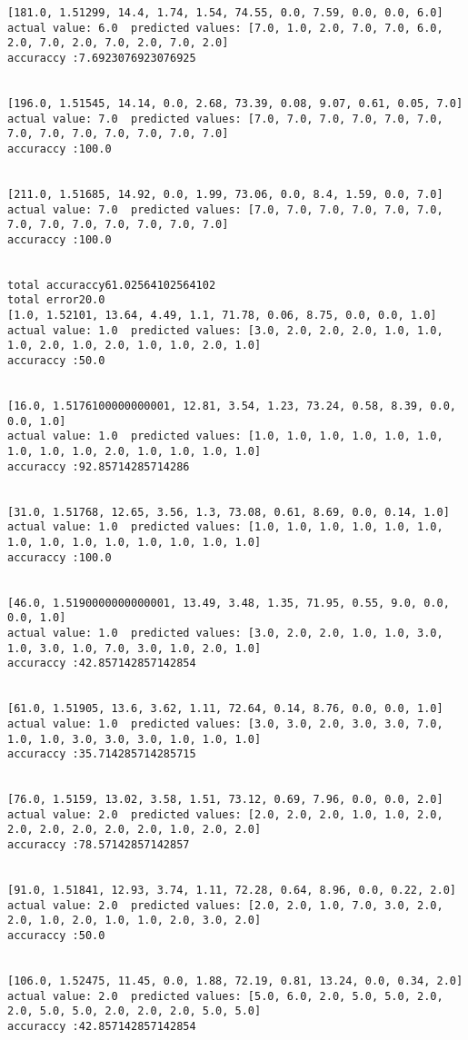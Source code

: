 \documentclass[11pt]{article}
\begin{document}
\begin{Verbatim}[commandchars=\\\{\}]
[181.0, 1.51299, 14.4, 1.74, 1.54, 74.55, 0.0, 7.59, 0.0, 0.0, 6.0]
actual value: 6.0  predicted values: [7.0, 1.0, 2.0, 7.0, 7.0, 6.0, 2.0, 7.0, 2.0, 7.0, 2.0, 7.0, 2.0]
accuraccy :7.6923076923076925


[196.0, 1.51545, 14.14, 0.0, 2.68, 73.39, 0.08, 9.07, 0.61, 0.05, 7.0]
actual value: 7.0  predicted values: [7.0, 7.0, 7.0, 7.0, 7.0, 7.0, 7.0, 7.0, 7.0, 7.0, 7.0, 7.0, 7.0]
accuraccy :100.0


[211.0, 1.51685, 14.92, 0.0, 1.99, 73.06, 0.0, 8.4, 1.59, 0.0, 7.0]
actual value: 7.0  predicted values: [7.0, 7.0, 7.0, 7.0, 7.0, 7.0, 7.0, 7.0, 7.0, 7.0, 7.0, 7.0, 7.0]
accuraccy :100.0


total accuraccy61.02564102564102
total error20.0
[1.0, 1.52101, 13.64, 4.49, 1.1, 71.78, 0.06, 8.75, 0.0, 0.0, 1.0]
actual value: 1.0  predicted values: [3.0, 2.0, 2.0, 2.0, 1.0, 1.0, 1.0, 2.0, 1.0, 2.0, 1.0, 1.0, 2.0, 1.0]
accuraccy :50.0


[16.0, 1.5176100000000001, 12.81, 3.54, 1.23, 73.24, 0.58, 8.39, 0.0, 0.0, 1.0]
actual value: 1.0  predicted values: [1.0, 1.0, 1.0, 1.0, 1.0, 1.0, 1.0, 1.0, 1.0, 2.0, 1.0, 1.0, 1.0, 1.0]
accuraccy :92.85714285714286


[31.0, 1.51768, 12.65, 3.56, 1.3, 73.08, 0.61, 8.69, 0.0, 0.14, 1.0]
actual value: 1.0  predicted values: [1.0, 1.0, 1.0, 1.0, 1.0, 1.0, 1.0, 1.0, 1.0, 1.0, 1.0, 1.0, 1.0, 1.0]
accuraccy :100.0


[46.0, 1.5190000000000001, 13.49, 3.48, 1.35, 71.95, 0.55, 9.0, 0.0, 0.0, 1.0]
actual value: 1.0  predicted values: [3.0, 2.0, 2.0, 1.0, 1.0, 3.0, 1.0, 3.0, 1.0, 7.0, 3.0, 1.0, 2.0, 1.0]
accuraccy :42.857142857142854


[61.0, 1.51905, 13.6, 3.62, 1.11, 72.64, 0.14, 8.76, 0.0, 0.0, 1.0]
actual value: 1.0  predicted values: [3.0, 3.0, 2.0, 3.0, 3.0, 7.0, 1.0, 1.0, 3.0, 3.0, 3.0, 1.0, 1.0, 1.0]
accuraccy :35.714285714285715


[76.0, 1.5159, 13.02, 3.58, 1.51, 73.12, 0.69, 7.96, 0.0, 0.0, 2.0]
actual value: 2.0  predicted values: [2.0, 2.0, 2.0, 1.0, 1.0, 2.0, 2.0, 2.0, 2.0, 2.0, 2.0, 1.0, 2.0, 2.0]
accuraccy :78.57142857142857


[91.0, 1.51841, 12.93, 3.74, 1.11, 72.28, 0.64, 8.96, 0.0, 0.22, 2.0]
actual value: 2.0  predicted values: [2.0, 2.0, 1.0, 7.0, 3.0, 2.0, 2.0, 1.0, 2.0, 1.0, 1.0, 2.0, 3.0, 2.0]
accuraccy :50.0


[106.0, 1.52475, 11.45, 0.0, 1.88, 72.19, 0.81, 13.24, 0.0, 0.34, 2.0]
actual value: 2.0  predicted values: [5.0, 6.0, 2.0, 5.0, 5.0, 2.0, 2.0, 5.0, 5.0, 2.0, 2.0, 2.0, 5.0, 5.0]
accuraccy :42.857142857142854



\end{Verbatim}
\end{document}
